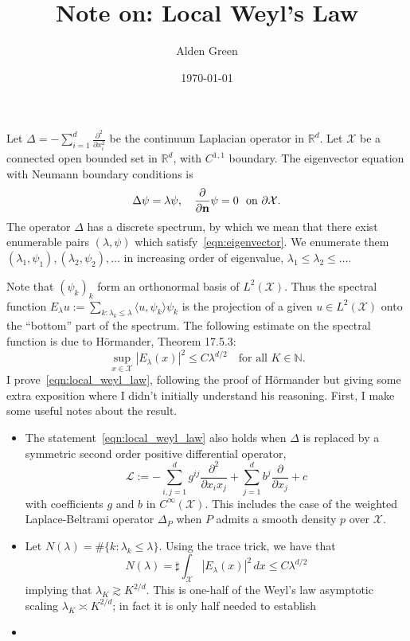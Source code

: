 \documentclass{article}
\newcommand{\Reals}{\mathbb{R}}
\newcommand{\1}{\mathbf{1}}
\newcommand{\Rd}{\Reals^d}
\newcommand{\mc}[1]{\mathcal{#1}}
\newcommand{\dotp}[2]{\langle #1, #2 \rangle}
\theoremstyle{definition}
\theoremstyle{remark}
\begin{document}
\title{Note on: Local Weyl's Law}
\author{Alden Green}
\date{\today}
\maketitle

Let $\Delta = -\sum_{i = 1}^{d} \frac{\partial^2}{\partial x_i^2}$ be the continuum Laplacian operator in $\Rd$. Let $\mc{X}$ be a connected open bounded set in $\Rd$, with $C^{1,1}$ boundary. The eigenvector equation with Neumann boundary conditions is
\begin{equation}
\label{eqn:eigenvector}
\Delta \psi = \lambda \psi,\quad \frac{\partial}{\partial {\bf n}}\psi = 0~~\textrm{on $\partial \mc{X}$.}
\end{equation}
The operator $\Delta$ has a discrete spectrum, by which we mean that there exist enumerable pairs $(\lambda,\psi)$ which satisfy~\eqref{eqn:eigenvector}. We enumerate them $(\lambda_1,\psi_1),(\lambda_2,\psi_2),\ldots$ in increasing order of eigenvalue, $\lambda_1 \leq \lambda_2 \leq \ldots$. 

Note that $(\psi_k)_{k}$ form an orthonormal basis of $L^2(\mc{X})$. Thus the spectral function $E_{\lambda}u := \sum_{k: \lambda_k \leq \lambda} \dotp{u}{\psi_k} \psi_k$ is the projection of a given $u \in L^2(\mc{X})$ onto the ``bottom'' part of the spectrum. The following estimate on the spectral function is due to H\"{o}rmander, Theorem 17.5.3:
\begin{equation}
\label{eqn:local_weyl_law}
\sup_{x \in \mc{X}} |E_{\lambda}(x)|^2 \leq C \lambda^{d/2} \quad \textrm{for all $K \in \mathbb{N}$.}
\end{equation}
I prove~\eqref{eqn:local_weyl_law}, following the proof of H\"{o}rmander but giving some extra exposition where I didn't initially understand his reasoning. First, I make some useful notes about the result.
\begin{itemize}
	\item The statement~\eqref{eqn:local_weyl_law} also holds when $\Delta$ is replaced by a symmetric second order positive differential operator,
	\begin{equation*}
	\mc{L} :=  -\sum_{i,j = 1}^{d} g^{ij}\frac{\partial^2}{\partial x_ix_j} + \sum_{j = 1}^{d} b^j \frac{\partial}{\partial x_j} + c
	\end{equation*}
	with coefficients $g$ and $b$ in $C^{\infty}(\mc{X})$. This includes the case of the weighted Laplace-Beltrami operator $\Delta_P$ when $P$ admits a smooth density $p$ over $\mc{X}$.
	\item Let $N(\lambda) = \#\{k: \lambda_k \leq \lambda\}$. Using the trace trick, we have that
	\begin{equation*}
	N(\lambda) = \sharp\int_{\mc{X}} |E_\lambda(x)|^2 \,dx \leq C\lambda^{d/2}
	\end{equation*}
	implying that $\lambda_K \gtrsim K^{2/d}$. This is one-half of the Weyl's law asymptotic scaling $\lambda_K \asymp K^{2/d}$; in fact it is only half needed to establish 
	\item 
\end{itemize}
\end{document}
